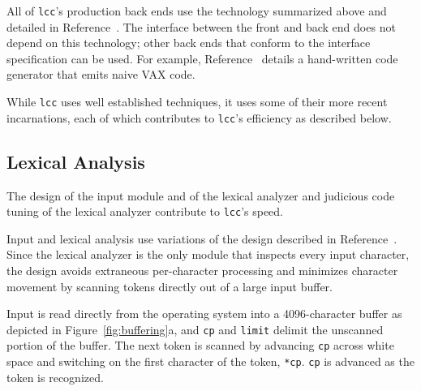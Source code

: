 All of \verb|lcc|'s production back ends use the technology
summarized above and detailed in Reference~\cite{fraser:sigplan89}.
The interface between the front and back end does not depend
on this technology; other back ends that conform to the interface
specification can be used. For example, Reference~\cite{fraser:hanson:91a}
details a hand-written code generator that emits naive VAX code.

While \verb|lcc| uses well established techniques, it uses some of their
more recent incarnations, each of which contributes to \verb|lcc|'s efficiency
as described below.

\subsection{Lexical Analysis}

The design of the input module and of
the lexical analyzer and judicious code tuning
of the lexical analyzer contribute to 
\verb|lcc|'s speed.

Input and lexical analysis use
variations of the design described in Reference~\cite{waite86}.
Since the lexical analyzer is the only module that
inspects every input character, the design
avoids extraneous per-character processing and
minimizes character movement by scanning tokens directly out
of a large input buffer.

Input is read directly from the operating system
into a 4096-character buffer as depicted
in Figure~\ref{fig:buffering}a, and \verb|cp| and \verb|limit|
delimit the unscanned portion of the buffer.
The next token is scanned by advancing \verb|cp| across
white space and switching on the first character of
the token, \verb|*cp|. \verb|cp| is advanced as the token is recognized.

